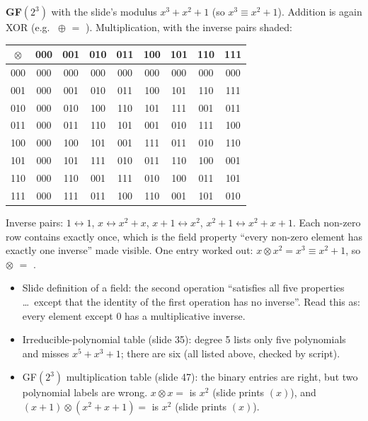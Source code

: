\textbf{GF$(2^3)$} with the slide's modulus $x^3 + x^2 + 1$ (so $x^3 \equiv x^2 + 1$). Addition is again XOR (e.g.\  $\oplus$  $=$ ). Multiplication, with the inverse pairs shaded:
\begin{center}\small\setlength{\tabcolsep}{4pt}
\begin{tabular}{@{}c|cccccccc@{}}
$\otimes$ & 000 & 001 & 010 & 011 & 100 & 101 & 110 & 111\\\hline
000 & 000 & 000 & 000 & 000 & 000 & 000 & 000 & 000\\
001 & 000 & \cellcolor{gold!25}001 & 010 & 011 & 100 & 101 & 110 & 111\\
010 & 000 & 010 & 100 & 110 & 101 & 111 & \cellcolor{gold!25}001 & 011\\
011 & 000 & 011 & 110 & 101 & \cellcolor{gold!25}001 & 010 & 111 & 100\\
100 & 000 & 100 & 101 & \cellcolor{gold!25}001 & 111 & 011 & 010 & 110\\
101 & 000 & 101 & 111 & 010 & 011 & 110 & 100 & \cellcolor{gold!25}001\\
110 & 000 & 110 & \cellcolor{gold!25}001 & 111 & 010 & 100 & 011 & 101\\
111 & 000 & 111 & 011 & 100 & 110 & \cellcolor{gold!25}001 & 101 & 010\\
\end{tabular}
\end{center}
Inverse pairs: $1 \leftrightarrow 1$, $x \leftrightarrow x^2 + x$, $x + 1 \leftrightarrow x^2$, $x^2 + 1 \leftrightarrow x^2 + x + 1$. Each non-zero row contains  exactly once, which is the field property ``every non-zero element has exactly one inverse'' made visible. One entry worked out: $x \otimes x^2 = x^3 \equiv x^2 + 1$, so  $\otimes$  $=$ .

\begin{fixbox}
\begin{itemize}
  \item Slide definition of a field: the second operation ``satisfies all five properties \dots\ except that the identity of the first operation has no inverse''. Read this as: every element except 0 has a multiplicative inverse.
  \item Irreducible-polynomial table (slide 35): degree 5 lists only five polynomials and misses $x^5 + x^3 + 1$; there are six (all listed above, checked by script).
  \item GF$(2^3)$ multiplication table (slide 47): the binary entries are right, but two polynomial labels are wrong. $x \otimes x = $  is $x^2$ (slide prints $(x)$), and $(x + 1) \otimes (x^2 + x + 1) = $  is $x^2$ (slide prints $(x)$).
\end{itemize}
\end{fixbox}
